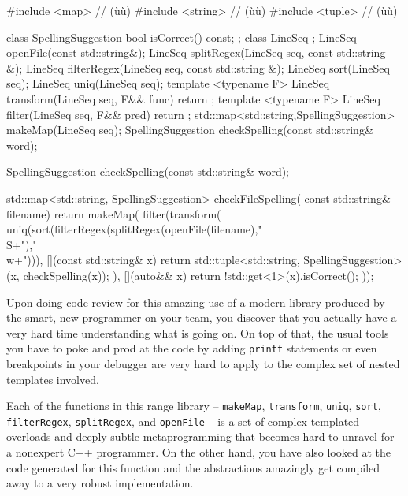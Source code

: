 \begin{emcppshiddenlisting}[emcppsbatch={e13,e14},emcppsstandards=c++14]
#include <map>     // (ù{}ù)
#include <string>  // (ù{}ù)
#include <tuple>   // (ù{}ù)

class SpellingSuggestion {
    bool isCorrect() const;
};
class LineSeq {};
LineSeq openFile(const std::string&);
LineSeq splitRegex(LineSeq seq, const std::string &);
LineSeq filterRegex(LineSeq seq, const std::string &);
LineSeq sort(LineSeq seq);
LineSeq uniq(LineSeq seq);
template <typename F>
LineSeq transform(LineSeq seq, F&& func) { return {}; }
template <typename F>
LineSeq filter(LineSeq seq, F&& pred) { return {}; }
std::map<std::string,SpellingSuggestion> makeMap(LineSeq seq);
SpellingSuggestion checkSpelling(const std::string& word);
\end{emcppshiddenlisting}
\begin{emcppslisting}[emcppsbatch=e13]
SpellingSuggestion checkSpelling(const std::string& word);

std::map<std::string, SpellingSuggestion> checkFileSpelling(
                                                   const std::string& filename)
{
    return makeMap(
        filter(transform(
           uniq(sort(filterRegex(splitRegex(openFile(filename),"\\S+"),"\\w+"))),
        [](const std::string& x)
        {
            return std::tuple<std::string, SpellingSuggestion>(x,
                                                             checkSpelling(x));
        }
   ), [](auto&& x) { return !std::get<1>(x).isCorrect(); }));
}
\end{emcppslisting}

\noindent Upon doing code review for this amazing use of a modern library produced
by the smart, new programmer on your team, you discover that you actually
have a very hard time understanding what is going on. On top of that,
the usual tools you have to poke and prod at the code by adding
\texttt{printf} statements or even breakpoints in your debugger are very
hard to apply to the complex set of nested templates involved.

Each of the functions in this range library -- \texttt{makeMap},
\texttt{transform}, \texttt{uniq}, \texttt{sort}, \texttt{filterRegex},
\texttt{splitRegex}, and \texttt{openFile} -- is a set of complex
templated overloads and deeply subtle metaprogramming that becomes hard
to unravel for a nonexpert C++ programmer. On the other hand, you have
also looked at the code generated for this function and the abstractions
amazingly get compiled away to a very robust implementation.


